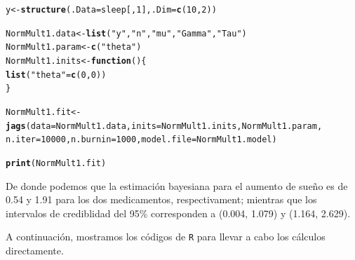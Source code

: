 \documentclass[10pt,openright]{book}\usepackage[]{graphicx}\usepackage[]{color}
\makeatletter
\newcommand{\hlnum}[1]{\textcolor[rgb]{0.686,0.059,0.569}{#1}}%
\newcommand{\hlstr}[1]{\textcolor[rgb]{0.192,0.494,0.8}{#1}}%
\newcommand{\hlstd}[1]{\textcolor[rgb]{0.345,0.345,0.345}{#1}}%
\newcommand{\hlkwa}[1]{\textcolor[rgb]{0.161,0.373,0.58}{\textbf{#1}}}%
\newcommand{\hlkwb}[1]{\textcolor[rgb]{0.69,0.353,0.396}{#1}}%
\newcommand{\hlkwc}[1]{\textcolor[rgb]{0.333,0.667,0.333}{#1}}%
\newcommand{\hlkwd}[1]{\textcolor[rgb]{0.737,0.353,0.396}{\textbf{#1}}}%
\newenvironment{kframe}{%
 \def\at@end@of@kframe{}%
 \ifinner\ifhmode%
  \def\at@end@of@kframe{\end{minipage}}%
  \begin{minipage}{\columnwidth}%
 \fi\fi%
 \def\FrameCommand##1{\hskip\@totalleftmargin \hskip-\fboxsep
 \colorbox{shadecolor}{##1}\hskip-\fboxsep
     \hskip-\linewidth \hskip-\@totalleftmargin \hskip\columnwidth}%
 \MakeFramed {\advance\hsize-\width
   \@totalleftmargin\z@ \linewidth\hsize
   \@setminipage}}%
 {\par\unskip\endMakeFramed%
 \at@end@of@kframe}
\newenvironment{knitrout}{}{} %
\makeatother
\begin{document}
\begin{Eje}
\begin{knitrout}
\begin{kframe}
\begin{alltt}
\hlstd{y} \hlkwb{<-} \hlkwd{structure}\hlstd{(}\hlkwc{.Data} \hlstd{= sleep[,}\hlnum{1}\hlstd{],} \hlkwc{.Dim}\hlstd{=}\hlkwd{c}\hlstd{(}\hlnum{10}\hlstd{,}\hlnum{2}\hlstd{))}

\hlstd{NormMult1.data} \hlkwb{<-} \hlkwd{list}\hlstd{(}\hlstr{"y"}\hlstd{,}\hlstr{"n"}\hlstd{,}\hlstr{"mu"}\hlstd{,}\hlstr{"Gamma"}\hlstd{,}\hlstr{"Tau"}\hlstd{)}
\hlstd{NormMult1.param} \hlkwb{<-} \hlkwd{c}\hlstd{(}\hlstr{"theta"}\hlstd{)}
\hlstd{NormMult1.inits} \hlkwb{<-} \hlkwa{function}\hlstd{()\{}
  \hlkwd{list}\hlstd{(}\hlstr{"theta"}\hlstd{=}\hlkwd{c}\hlstd{(}\hlnum{0}\hlstd{,}\hlnum{0}\hlstd{))}
\hlstd{\}}

\hlstd{NormMult1.fit} \hlkwb{<-} \hlkwd{jags}\hlstd{(}\hlkwc{data}\hlstd{=NormMult1.data,} \hlkwc{inits}\hlstd{=NormMult1.inits, NormMult1.param,}
                      \hlkwc{n.iter}\hlstd{=}\hlnum{10000}\hlstd{,} \hlkwc{n.burnin}\hlstd{=}\hlnum{1000}\hlstd{,} \hlkwc{model.file}\hlstd{=NormMult1.model)}

\hlkwd{print}\hlstd{(NormMult1.fit)}
\end{alltt}
\end{kframe}
\end{knitrout}
De donde podemos que la estimaci\'on bayesiana para el aumento de sue\~no es de 0.54 y 1.91 para los dos medicamentos, respectivament; mientras que los intervalos de crediblidad del 95\% corresponden a (0.004, 1.079) y (1.164, 2.629).

A continuaci\'on, mostramos los c\'odigos de \verb'R' para llevar a cabo los c\'alculos directamente.


\end{Eje}
\end{document}
